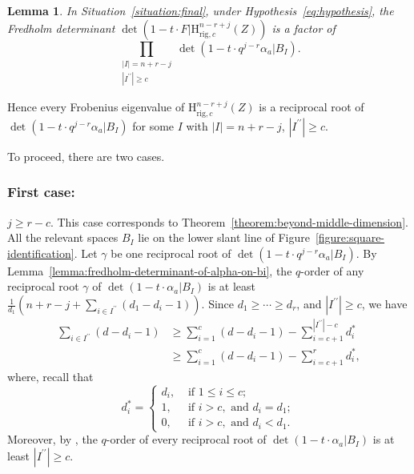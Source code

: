 \documentclass{amsart}
\numberwithin{equation}{section}
\theoremstyle{plain}
\newtheorem{lemma}[equation]{Lemma}
\theoremstyle{definition}
\begin{document}
\begin{lemma}\label{lemma:refined}
In Situation~\ref{situation:final}, under Hypothesis~\ref{eq:hypothesis},
the Fredholm determinant \(\det(1-t\cdot F| \mathrm{H}^{n-r+j}_{\mathrm{rig},c}(Z))\)
is a factor of
\[
  \prod_{\substack{|I|=n+r-j \\ |I^{\prime\prime}| \geq c}}\det(1-t\cdot q^{j-r}\alpha_{a}| B_{I}).
\]
\end{lemma}

Hence every Frobenius eigenvalue of \(\mathrm{H}^{n-r+j}_{\mathrm{rig},c}(Z)\)
is a reciprocal root of \(\det(1-t\cdot q^{j-r}\alpha_{a} | B_{I})\)
for some \(I\) with \(|I|=n+r-j\), \(|I^{\prime\prime}| \geq c\).


\medskip
To proceed, there are two cases.

\subsubsection*{First case:} \(j\geq r-c\).  This case
corresponds to Theorem~\ref{theorem:beyond-middle-dimension}.  All the
relevant spaces \(B_{I}\) lie on the lower slant line of
Figure~\ref{figure:square-identification}.
Let \(\gamma\) be one reciprocal root of
\(\det(1-t\cdot q^{j-r}\alpha_{a} | B_{I})\).
By Lemma~\ref{lemma:fredholm-determinant-of-alpha-on-bi},
the \(q\)-order of any reciprocal root \(\gamma\)
of \(\det(1-t\cdot \alpha_{a}| B_I)\) is at least
\(\frac{1}{d_1}\left( n+r-j+ \sum_{i\in I^{\prime\prime}} (d_1-d_i-1) \right)\).
Since \(d_1\geq \cdots \geq d_r\), and \(|I^{\prime\prime}|\geq c\),
we have
\begin{align*}
  \sum_{i\in I^{\prime\prime}}(d-d_i-1) &\geq \sum_{i=1}^{c}(d-d_i-1)-\sum_{i=c+1}^{|I^{\prime\prime}|-c}d_{i}^{*} \\
  &\geq \sum_{i=1}^{c}(d-d_i-1)-\sum_{i=c+1}^{r}d_{i}^*,
\end{align*}
where, recall that
\begin{equation*}
  d_i^* =
  \begin{cases}
    d_i, & \text{ if }1\leq i \leq c; \\
    1, & \text{ if }i>c, \text{ and }d_i = d_1; \\
    0, & \text{ if }i> c, \text{ and }d_i < d_1.
  \end{cases}
\end{equation*}
Moreover, by \cite[Lemma~3.1]{wan:poles},
the \(q\)-order of every reciprocal root of
\(\det(1-t\cdot \alpha_{a}| B_I)\)
is at least \(|I^{\prime\prime}| \geq c\).
\end{document}
